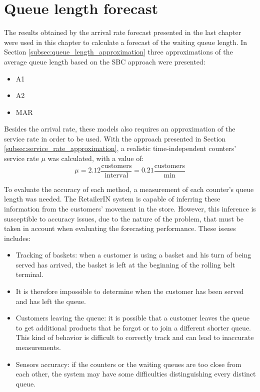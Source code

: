 \section{Queue length forecast}
\label{sec:queue_length_forecast_results}

The results obtained by the arrival rate forecast presented in the last chapter were used in this chapter to calculate a forecast of the waiting queue length. In Section \ref{subsec:queue_length_approximation} three approximations of the average queue length based on the SBC approach were presented:
\begin{itemize}
  \item A1
  \item A2
  \item MAR
\end{itemize}

Besides the arrival rate, these models also requires an approximation of the service rate in order to be used. With the approach presented in Section \ref{subsec:service_rate_approximation}, a realistic time-independent counters’ service rate \( \mu \) was calculated, with a value of:
\begin{equation}
  \mu = 2.12 \frac{\text{customers}}{\text{interval}} = 0.21 \frac{\text{customers}}{\text{min}}
\end{equation}

To evaluate the accuracy of each method, a measurement of each counter’s queue length was needed. The RetailerIN system is capable of inferring these information from the customers’ movement in the store. However, this inference is susceptible to accuracy issues, due to the nature of the problem, that must be taken in account when evaluating the forecasting performance. These issues includes:
\begin{itemize}
  \item Tracking of baskets: when a customer is using a basket and his turn of being served has arrived, the basket is left at the beginning of the rolling belt terminal. \item It is therefore impossible to determine when the customer has been served and has left the queue.
  \item Customers leaving the queue: it is possible that a customer leaves the queue to get additional products that he forgot or to join a different shorter queue. This kind of behavior is difficult to correctly track and can lead to inaccurate measurements.
  \item Sensors accuracy: if the counters or the waiting queues are too close from each other, the system may have some difficulties distinguishing every distinct queue.
\end{itemize}

